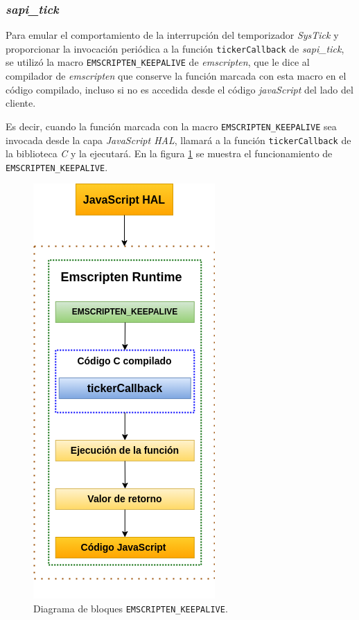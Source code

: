 \subsubsection{\textit{\textbf{sapi\_tick}}}

Para emular el comportamiento de la interrupción del temporizador \textit{SysTick} y proporcionar la invocación periódica a la función \texttt{tickerCallback} de \textit{sapi\_tick}, se utilizó la macro \texttt{EMSCRIPTEN\_KEEPALIVE} de \textit{emscripten}, que le dice al compilador de \textit{emscripten} que conserve la función marcada con esta macro en el código compilado, incluso si no es accedida desde el código \textit{javaScript} del lado del cliente.

Es decir, cuando la función marcada con la macro \texttt{EMSCRIPTEN\_KEEPALIVE} sea invocada desde la capa \textit{JavaScript HAL}, llamará a la función \texttt{tickerCallback} de la biblioteca \textit{C} y la ejecutará. En la figura \ref{fig:tickerCallback} se muestra el funcionamiento de \texttt{EMSCRIPTEN\_KEEPALIVE}. 


\begin{figure}[ht]
	\centering
	\includegraphics[scale=.42]{./Figures/tickerCallback.png}
	\caption{Diagrama de bloques \texttt{EMSCRIPTEN\_KEEPALIVE}.}
	\label{fig:tickerCallback}
\end{figure}


